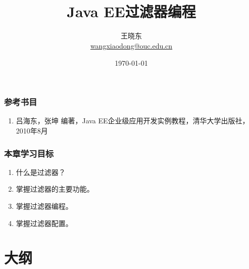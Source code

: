 
\title[KevinW@OUC]{\\  
Java EE过滤器编程}
\author[王晓东]{王晓东\\
  \href{mailto:wangxiaodong@ouc.edu.cn}{\footnotesize wangxiaodong@ouc.edu.cn}}
\date{\today}


 \frame{\titlepage}

\begin{frame}
\frametitle{参考书目}
\begin{enumerate}
\item 吕海东，张坤 编著，Java EE企业级应用开发实例教程，清华大学出版社，2010年8月
\end{enumerate}  
\end{frame}

\begin{frame}
\frametitle{本章学习目标}
\begin{enumerate}
\item 什么是过滤器？
\item 掌握过滤器的主要功能。
\item 掌握过滤器编程。
\item 掌握过滤器配置。
\end{enumerate}  
\end{frame}

\section*{大纲}

